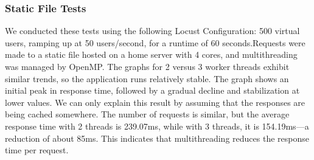 \subsubsection*{Static File Tests}
We conducted these tests using the following Locust Configuration: 500 virtual users, ramping up at 50 users/second, for a runtime of 60 seconds.Requests were made to a static file hosted on a home server with 4 cores, and multithreading was managed by OpenMP.
The graphs for 2 versus 3 worker threads exhibit similar trends, so the application runs relatively stable. The graph shows an initial peak in response time, followed by a gradual decline and stabilization at lower values. We can only explain this result by assuming that the responses are being cached somewhere.
The number of requests is similar, but the average response time with 2 threads is 239.07ms, while with 3 threads, it is 154.19ms—a reduction of about 85ms. This indicates that multithreading reduces the response time per request.
